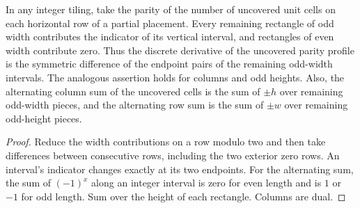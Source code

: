 \documentclass[11pt]{article}
\begin{document}
\begin{proposition}\label{parity}
In any integer tiling, take the parity of the number of uncovered unit cells on
each horizontal row of a partial placement. Every remaining rectangle of odd
width contributes the indicator of its vertical interval, and rectangles of even
width contribute zero. Thus the discrete derivative of the uncovered parity
profile is the symmetric difference of the endpoint pairs of the remaining
odd-width intervals. The analogous assertion holds for columns and odd heights.
Also, the alternating column sum of the uncovered cells is the sum of
$\pm h$ over remaining odd-width pieces, and the alternating row sum is the
sum of $\pm w$ over remaining odd-height pieces.
\end{proposition}
\begin{proof}
Reduce the width contributions on a row modulo two and then take differences
between consecutive rows, including the two exterior zero rows. An interval's
indicator changes exactly at its two endpoints. For the alternating sum, the
sum of $(-1)^x$ along an integer interval is zero for even length and is $1$ or
$-1$ for odd length. Sum over the height of each rectangle. Columns are dual.
\end{proof}
\end{document}
